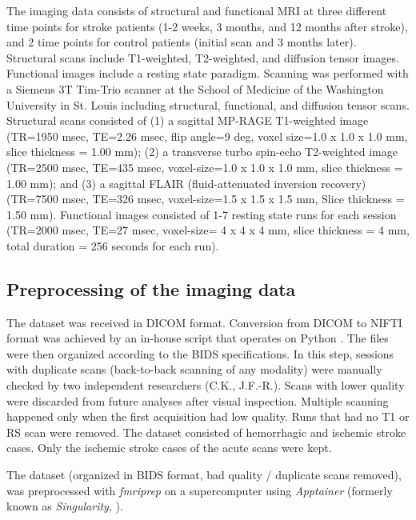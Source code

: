 \documentclass[fleqn,10pt]{wlscirep}
\begin{document}
The imaging data consists of structural and functional MRI at three different time points for stroke patients (1-2 weeks, 3 months, and 12 months after stroke), and 2 time points for control patients (initial scan and 3 months later). Structural scans include T1-weighted, T2-weighted, and diffusion tensor images. Functional images include a resting state paradigm. Scanning was performed with a Siemens 3T Tim-Trio scanner at the School of Medicine of the Washington University in St. Louis including structural, functional, and diffusion tensor scans. Structural scans consisted of (1) a sagittal MP-RAGE T1-weighted image (TR=1950 msec, TE=2.26 msec, flip angle=9 deg, voxel size=1.0 x 1.0 x 1.0 mm, slice thickness = 1.00 mm); (2) a transverse turbo spin-echo T2-weighted image (TR=2500 msec, TE=435 msec, voxel-size=1.0 x 1.0 x 1.0 mm, slice thickness = 1.00 mm); and (3) a sagittal FLAIR (fluid-attenuated inversion recovery) (TR=7500 msec, TE=326 msec, voxel-size=1.5 x 1.5 x 1.5 mm, Slice thickness = 1.50 mm). Functional images consisted of 1-7 resting state runs for each session (TR=2000 msec, TE=27 msec, voxel-size= 4 x 4 x 4 mm, slice thickness = 4 mm, total duration = 256 seconds for each run). 

\subsection*{Preprocessing of the imaging data}
The dataset was received in DICOM format. Conversion from DICOM to NIFTI format was achieved by an in-house script that operates on Python \citep{rogetgithub}. The files were then organized according to the BIDS specifications. In this step, sessions with duplicate scans (back-to-back scanning of any modality) were manually checked by two independent researchers (C.K., J.F.-R.). Scans with lower quality were discarded from future analyses after visual inspection. Multiple scanning happened only when the first acquisition had low quality. Runs that had no T1 or RS scan were removed. The dataset consisted of hemorrhagic and ischemic stroke cases. Only the ischemic stroke cases of the acute scans were kept. 

The dataset (organized in BIDS format, bad quality / duplicate scans removed), was preprocessed with \emph{fmriprep} \citep{fmriprep1} on a supercomputer using \emph{Apptainer} (formerly known as \emph{Singularity}, \cite{kurtzer2017singularity}).  
\end{document}
